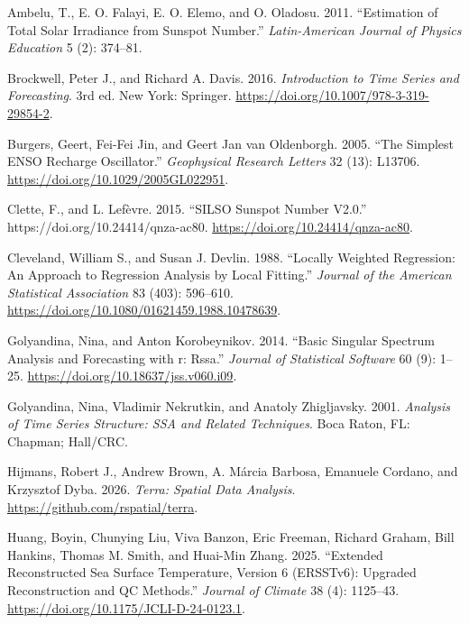 \documentclass[
  letterpaper,
  DIV=11,
  numbers=noendperiod]{scrartcl}
\newlength{\cslhangindent}
\newenvironment{CSLReferences}[2] %
 {\begin{list}{}{%
  \setlength{\itemindent}{0pt}
  \setlength{\leftmargin}{0pt}
  \setlength{\parsep}{0pt}
  \ifodd #1
   \setlength{\leftmargin}{\cslhangindent}
   \setlength{\itemindent}{-1\cslhangindent}
  \fi
  \setlength{\itemsep}{#2\baselineskip}}}
 {\end{list}}
\begin{document}
\label{refs}
\begin{CSLReferences}{1}{0}
Ambelu, T., E. O. Falayi, E. O. Elemo, and O. Oladosu. 2011.
{``Estimation of Total Solar Irradiance from Sunspot Number.''}
\emph{Latin-American Journal of Physics Education} 5 (2): 374--81.

Brockwell, Peter J., and Richard A. Davis. 2016. \emph{Introduction to
Time Series and Forecasting}. 3rd ed. New York: Springer.
\url{https://doi.org/10.1007/978-3-319-29854-2}.

Burgers, Geert, Fei-Fei Jin, and Geert Jan van Oldenborgh. 2005. {``The
Simplest ENSO Recharge Oscillator.''} \emph{Geophysical Research
Letters} 32 (13): L13706. \url{https://doi.org/10.1029/2005GL022951}.

Clette, F., and L. Lefèvre. 2015. {``{SILSO Sunspot Number V2.0}.''}
https://doi.org/10.24414/qnza-ac80.
\url{https://doi.org/10.24414/qnza-ac80}.

Cleveland, William S., and Susan J. Devlin. 1988. {``Locally Weighted
Regression: An Approach to Regression Analysis by Local Fitting.''}
\emph{Journal of the American Statistical Association} 83 (403):
596--610. \url{https://doi.org/10.1080/01621459.1988.10478639}.

Golyandina, Nina, and Anton Korobeynikov. 2014. {``Basic Singular
Spectrum Analysis and Forecasting with r: {Rssa}.''} \emph{Journal of
Statistical Software} 60 (9): 1--25.
\url{https://doi.org/10.18637/jss.v060.i09}.

Golyandina, Nina, Vladimir Nekrutkin, and Anatoly Zhigljavsky. 2001.
\emph{Analysis of Time Series Structure: SSA and Related Techniques}.
Boca Raton, FL: Chapman; Hall/CRC.

Hijmans, Robert J., Andrew Brown, A. Márcia Barbosa, Emanuele Cordano,
and Krzysztof Dyba. 2026. \emph{Terra: Spatial Data Analysis}.
\url{https://github.com/rspatial/terra}.

Huang, Boyin, Chunying Liu, Viva Banzon, Eric Freeman, Richard Graham,
Bill Hankins, Thomas M. Smith, and Huai-Min Zhang. 2025. {``Extended
Reconstructed Sea Surface Temperature, Version 6 (ERSSTv6): Upgraded
Reconstruction and QC Methods.''} \emph{Journal of Climate} 38 (4):
1125--43. \url{https://doi.org/10.1175/JCLI-D-24-0123.1}.


\end{CSLReferences}
\end{document}
